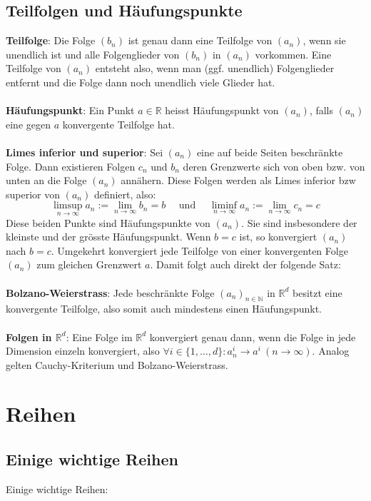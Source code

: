 \documentclass[a4paper,10pt]{scrartcl}
\newcommand{\limi}{\lim\limits_{n\rightarrow \infty}}
\begin{document}
\subsection{Teilfolgen und Häufungspunkte}
\textbf{Teilfolge}: Die Folge $(b_n)$ ist genau dann eine Teilfolge von $(a_n)$, wenn sie unendlich ist und alle Folgenglieder von $(b_n)$ in $(a_n)$ vorkommen. Eine Teilfolge von $(a_n)$ entsteht also, wenn man (ggf. unendlich) Folgenglieder entfernt und die Folge dann noch unendlich viele Glieder hat. \\\\
\textbf{Häufungspunkt}: Ein Punkt $a\in \mathbb{R}$ heisst Häufungspunkt von $(a_n)$, falls $(a_n)$ eine gegen $a$ konvergente Teilfolge hat. \\\\
\textbf{Limes inferior und superior}: Sei $(a_n)$ eine auf beide Seiten beschränkte Folge. Dann existieren Folgen $c_n$ und $b_n$ deren Grenzwerte sich von oben bzw. von unten an die Folge $(a_n)$ annähern. Diese Folgen werden als Limes inferior bzw superior von $(a_n)$ definiert, also: \\
\begin{equation}
	\limsup\limits_{n\to \infty} a_n := \limi b_n = b \quad \text{ und } \quad
	\liminf\limits_{n\to \infty} a_n := \limi c_n = c
\end{equation}
Diese beiden Punkte sind Häufungspunkte von $(a_n)$. Sie sind insbesondere der kleinste und der grösste Häufungspunkt. Wenn $b=c$ ist, so konvergiert $(a_n)$ nach $b=c$. Umgekehrt konvergiert jede Teilfolge von einer konvergenten Folge $(a_n)$ zum gleichen Grenzwert $a$. Damit folgt auch direkt der folgende Satz: \\\\
\textbf{Bolzano-Weierstrass}: Jede beschränkte Folge $(a_n)_{n\in \mathbb{N}}$ in $\mathbb{R}^d$ besitzt eine konvergente Teilfolge, also somit auch mindestens einen Häufungspunkt.\\\\
\textbf{Folgen in $\mathbb{R}^d$}: Eine Folge im $\mathbb{R}^d$ konvergiert genau dann, wenn die Folge in jede Dimension einzeln konvergiert, also $\forall i\in \{1,\dots,d\}: a_n^i \to a^i\ (n\to \infty)$. Analog gelten Cauchy-Kriterium und Bolzano-Weierstrass. 
\pagebreak 
\section{Reihen}
\subsection{Einige wichtige Reihen}
Einige wichtige Reihen: 
\end{document}
